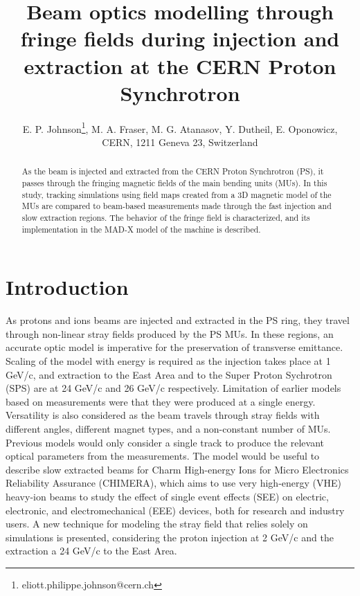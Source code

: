 \documentclass[a4paper,
               biblatex,     %
               keeplastbox,   %
               ]{jacow}
\begin{document}
\title{Beam optics modelling through fringe fields during injection and extraction at the CERN Proton Synchrotron}

\author{E. P. Johnson\thanks{eliott.philippe.johnson@cern.ch}, M. A. Fraser, M. G. Atanasov, Y. Dutheil, E. Oponowicz,\\ CERN, 1211 Geneva 23, Switzerland}
	
\maketitle

%
\begin{abstract}
As the beam is injected and extracted from the CERN Proton Synchrotron (PS), it passes through the fringing magnetic fields of the main bending units (MUs). In this study, tracking simulations using field maps created from a 3D magnetic model of the MUs are compared to beam-based measurements made through the fast injection and slow extraction regions. The behavior of the fringe field is characterized, and its implementation in the MAD-X model of the machine is described.
\end{abstract}


\section{Introduction}
As protons and ions beams are injected and extracted in the PS ring, they travel through non-linear stray fields produced by the PS MUs. In these regions, an accurate optic model is imperative for the preservation of transverse emittance. Scaling of the model with energy is required as the injection takes place at 1 GeV/c, and extraction to the East Area and to the Super Proton Sychrotron (SPS) are at 24 GeV/c and 26 GeV/c respectively. Limitation of earlier models based on measurements were that they were produced at a single energy. Versatility is also considered as the beam travels through stray fields with different angles, different magnet types, and a non-constant number of MUs. Previous models would only consider a single track to produce the relevant optical parameters from the measurements. The model would be useful to describe slow extracted beams for Charm High-energy Ions for Micro Electronics Reliability Assurance (CHIMERA), which aims to use very high-energy (VHE) heavy-ion beams to study the effect of single event effects (SEE) on electric, electronic, and electromechanical (EEE) devices, both for research and industry users. A new technique for modeling the stray field that relies solely on simulations is presented, considering the proton injection at 2 GeV/c and the extraction a 24 GeV/c to the East Area.
\end{document}
